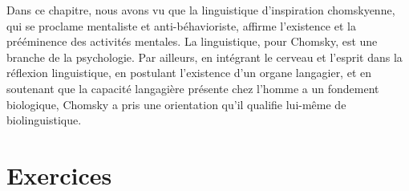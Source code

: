 Dans ce chapitre, nous avons vu que la linguistique d’inspiration chomskyenne, qui se proclame mentaliste et anti-béhavioriste, affirme l’existence et la prééminence des activités mentales. La linguistique, pour Chomsky, est une branche de la psychologie. Par ailleurs, en intégrant le cerveau et l’esprit dans la réflexion linguistique, en postulant l’existence d’un organe langagier, et en soutenant que la capacité langagière présente chez l’homme a un fondement biologique, Chomsky a pris une orientation qu’il qualifie lui-même de biolinguistique.\par

\section*{Exercices}
